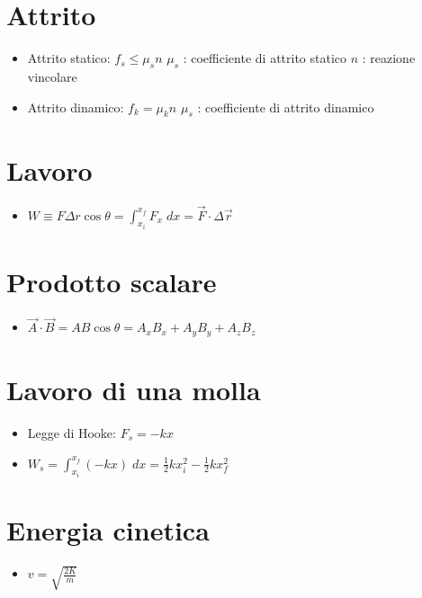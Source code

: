 \documentclass[a4paper,14pt,landscape]{extarticle}
\begin{document}
\begin{multicols*}{2}
    \section*{Attrito}
    \begin{itemize}
        \item Attrito statico: $f_s \leq \mu_s n$ \newline
              $\mu_s$ : coefficiente di attrito statico \newline
              $n$ : reazione vincolare
        \item Attrito dinamico: $f_k = \mu_k n$ \newline
              $\mu_s$ : coefficiente di attrito dinamico
    \end{itemize}

    \section*{Lavoro}
    \begin{itemize}
        \item $W \equiv F \Delta r \cos{\theta} = \int_{x_i}^{x_f} F_x \; dx = \vec{F} \cdot \Delta \vec{r}$
    \end{itemize}

    \section*{Prodotto scalare}
    \begin{itemize}
        \item $\vec{A} \cdot \vec{B} = AB\cos{\theta} = A_xB_x + A_yB_y + A_zB_z$
    \end{itemize}

    \section*{Lavoro di una molla}
    \begin{itemize}
        \item Legge di Hooke: $F_s = -kx$
        \item $W_s = \int_{x_i}^{x_f} (-kx) \; dx = \tfrac{1}{2}kx_i^2 - \tfrac{1}{2}kx_f^2$
    \end{itemize}

    \section*{Energia cinetica}
    \begin{itemize}
        \item $v = \sqrt{\tfrac{2K}{m}}$
    \end{itemize}


\end{multicols*}
\end{document}
